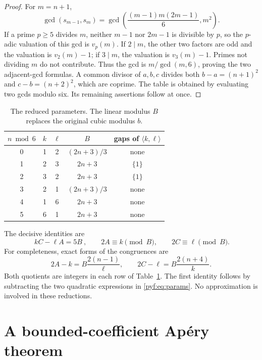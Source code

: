 \documentclass[11pt,a4paper]{article}
\numberwithin{equation}{section}
\theoremstyle{definition}
\begin{document}
\begin{proof}
For $m=n+1$,
\[
\gcd(s_{m-1},s_m)=\gcd\left(\frac{(m-1)m(2m-1)}6,m^2\right).
\]
If a prime $p\geq5$ divides $m$, neither $m-1$ nor $2m-1$ is divisible by
$p$, so the $p$-adic valuation of this gcd is $v_p(m)$. If $2\mid m$,
the other two factors are odd and the valuation is $v_2(m)-1$; if
$3\mid m$, the valuation is $v_3(m)-1$. Primes not dividing $m$ do not
contribute. Thus the gcd is $m/\gcd(m,6)$, proving the two adjacent-gcd
formulas. A common divisor of $a,b,c$ divides both
$b-a=(n+1)^2$ and $c-b=(n+2)^2$, which are coprime. The table is obtained
by evaluating two gcds modulo six. Its remaining assertions follow at once.
\end{proof}

\begin{table}[ht]
\centering
\caption{The reduced parameters. The linear modulus $B$ replaces the
original cubic modulus $b$.}\label{pyf:tab:params}
\begin{tabular}{ccccc}
\toprule
$n\bmod6$ & $k$ & $\ell$ & $B$ & gaps of $\langle k,\ell\rangle$\\
\midrule
0 & 1 & 2 & $(2n+3)/3$ & none\\
1 & 2 & 3 & $2n+3$ & $\{1\}$\\
2 & 3 & 2 & $2n+3$ & $\{1\}$\\
3 & 2 & 1 & $(2n+3)/3$ & none\\
4 & 1 & 6 & $2n+3$ & none\\
5 & 6 & 1 & $2n+3$ & none\\
\bottomrule
\end{tabular}
\end{table}

The decisive identities are
\begin{equation}\label{pyf:eq:key}
\boxed{\ kC-\ell A=5B\ },\qquad
2A\equiv k\pmod B,\qquad 2C\equiv\ell\pmod B.
\end{equation}
For completeness, exact forms of the congruences are
\begin{equation}\label{pyf:eq:exactcong}
2A-k=B\frac{2(n-1)}{\ell},\qquad
2C-\ell=B\frac{2(n+4)}k.
\end{equation}
Both quotients are integers in each row of Table~\ref{pyf:tab:params}.
The first identity follows by subtracting the two quadratic expressions in
\eqref{pyf:eq:params}. No approximation is involved in these reductions.

\section{A bounded-coefficient Ap\'ery theorem}\label{pyf:sec:apery}
\end{document}
